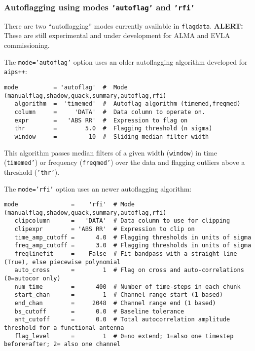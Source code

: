 \subsubsection{Autoflagging using modes {\tt 'autoflag'} and {\tt 'rfi'}}
\label{section:edit.flagdata.autoflag}

There are two ``autoflagging'' modes currently available in {\tt flagdata}.
{\bf ALERT:} These are still experimental and under development for
ALMA and EVLA commissioning.

The {\tt mode='autoflag'} option uses an older autoflagging algorithm
developed for {\tt aips++}:
\small
\begin{verbatim}
mode          = 'autoflag'  #  Mode (manualflag,shadow,quack,summary,autoflag,rfi)
   algorithm  =  'timemed'  #  Autoflag algorithm (timemed,freqmed)
   column     =     'DATA'  #  Data column to operate on.
   expr       =   'ABS RR'  #  Expression to flag on
   thr        =        5.0  #  Flagging threshold (n sigma)
   window     =         10  #  Sliding median filter width
\end{verbatim}
\normalsize
This algorithm passes median filters of a given width ({\tt window})
in time ({\tt timemed'}) or frequency ({\tt freqmed'}) over the data
and flagging outliers above a threshold ({\tt 'thr'}).

The {\tt mode='rfi'} option uses an newer autoflagging algorithm:
\small
\begin{verbatim}
mode               =    'rfi'  # Mode (manualflag,shadow,quack,summary,autoflag,rfi)
   clipcolumn      =   'DATA'  # Data column to use for clipping
   clipexpr        = 'ABS RR'  # Expression to clip on
   time_amp_cutoff =      4.0  # Flagging thresholds in units of sigma
   freq_amp_cutoff =      3.0  # Flagging thresholds in units of sigma
   freqlinefit     =    False  # Fit bandpass with a straight line (True), else piecewise polynomial
   auto_cross      =        1  # Flag on cross and auto-correlations (0=autocor only)
   num_time        =      400  # Number of time-steps in each chunk
   start_chan      =        1  # Channel range start (1 based)
   end_chan        =     2048  # Channel range end (1 based)
   bs_cutoff       =      0.0  # Baseline tolerance
   ant_cutoff      =      0.0  # Total autocorrelation amplitude threshold for a functional antenna
   flag_level      =        1  # 0=no extend; 1=also one timestep before+after; 2= also one channel
\end{verbatim}
\normalsize


